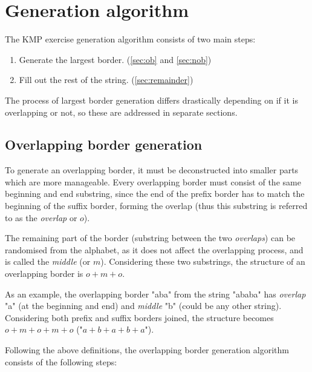 \documentclass{l4proj}
\begin{document}
\section{Generation algorithm}
\label{sec:kgen}

The KMP exercise generation algorithm consists of two main steps:
\begin{enumerate}
	\item
	Generate the largest border. (\autoref{sec:ob} and \autoref{sec:nob})
	\item
	Fill out the rest of the string. (\autoref{sec:remainder})
\end{enumerate}

The process of largest border generation differs drastically depending on if it is overlapping or not, so these are addressed in separate sections.

\subsection{Overlapping border generation}
\label{sec:ob}

To generate an overlapping border, it must be deconstructed into smaller parts which are more manageable. Every overlapping border must consist of the same beginning and end substring, since the end of the prefix border has to match the beginning of the suffix border, forming the overlap (thus this substring is referred to as the \emph{overlap} or $o$). 

The remaining part of the border (substring between the two \emph{overlaps}) can be randomised from the alphabet, as it does not affect the overlapping process, and is called the \emph{middle} (or $m$). Considering these two substrings, the structure of an overlapping border is $o+m+o$.

 As an example, the overlapping border "aba" from the string "ababa" has \emph{overlap} "a" (at the beginning and end) and \emph{middle} "b" (could be any other string). Considering both prefix and suffix borders joined, the structure becomes $o+m+o+m+o$ ("$a+b+a+b+a$").

Following the above definitions, the overlapping border generation algorithm consists of the following steps:
\end{document}
